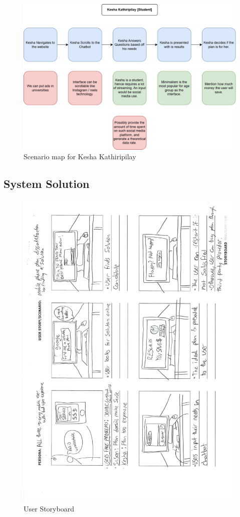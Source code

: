 \documentclass[conference]{IEEEtran}
\begin{document}
\begin{figure}[H]
    \centering
    \includegraphics[width=1\linewidth]{ScenarioMap.Kesha-drawio.png}
    \caption{Scenario map for Kesha Kathiripilay}
    \label{fig:scenario-map-Kesha}
\end{figure}

\subsection{System Solution}
\begin{figure}[H]
    \centering
    \includegraphics[width=1\linewidth]{storyboard.pdf}
    \caption{User Storyboard}
    \label{fig:story-board}
\end{figure}
\end{document}

